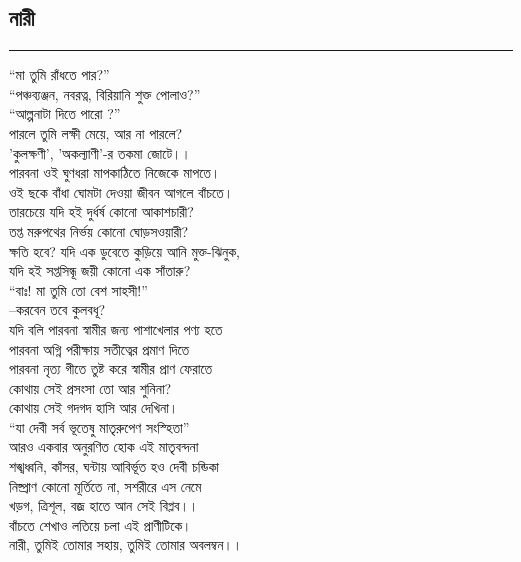 \documentclass[12pt]{article}
\begin{document}
\subsection*{নারী }
\hrule
\vspace{1in}
``মা তুমি রাঁধতে পার?''\\
``পঞ্চব্যঞ্জন, নবরত্ন, বিরিয়ানি শুক্ত পোলাও?''\\
``আল্পনাটা দিতে পারো ?''\\
পারলে তুমি লক্ষী মেয়ে, আর না পারলে?\\
'কুলক্ষণী', 'অকল্যাণী'-র তকমা জোটে।।\\
পারবনা ওই ঘুণধরা মাপকাঠিতে নিজেকে মাপতে।\\
ওই ছকে বাঁধা ঘোমটা দেওয়া জীবন আগলে বাঁচতে।\\
তারচেয়ে যদি হই দুর্ধর্ষ কোনো আকাশচারী?\\
তপ্ত মরুপথের নির্ভয় কোনো ঘোড়সওয়ারী?\\
ক্ষতি হবে? যদি এক ডুবেতে কুড়িয়ে আনি মুক্ত-ঝিনুক,\\
যদি হই সপ্তসিন্ধূ জয়ী কোনো এক সাঁতারু?\\
``বাঃ! মা তুমি তো বেশ সাহসী!''\\
--করবেন তবে কুলবধূ?\\
যদি বলি পারবনা স্বামীর জন্য পাশাখেলার পণ্য হতে\\
পারবনা অগ্নি পরীক্ষায় সতীত্বের প্রমাণ দিতে\\
পারবনা নৃত্য গীতে তুষ্ট করে স্বামীর প্রাণ ফেরাতে\\
কোথায় সেই প্রসংসা তো আর শুনিনা?\\
কোথায় সেই গদগদ হাসি আর দেখিনা।\\
``যা দেবী সর্ব ভূতেষু মাতৃরুপেণ সংস্হিতা''\\
আরও একবার অনুরণিত হোক এই মাতৃবন্দনা\\
শঙ্খধ্বনি, কাঁসর, ঘন্টায় আবির্ভূত হও দেবী চন্ডিকা\\
নিষ্প্রাণ কোনো মূর্তিতে না, সশরীরে এস নেমে\\
খড়গ, ত্রিশূল, বজ্র হাতে আন সেই বিপ্লব।।\\
বাঁচতে শেখাও লতিয়ে চলা এই প্রাণীটিকে।\\
নারী, তুমিই তোমার সহায়, তুমিই তোমার অবলম্বন।।\\
\newpage
\end{document}
